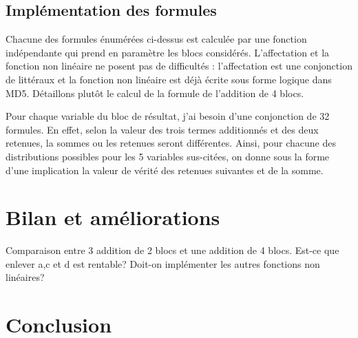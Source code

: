 \documentclass{article}
\begin{document}
\subsection{Implémentation des formules}
Chacune des formules énumérées ci-dessus est calculée par une fonction indépendante qui prend en paramètre les blocs considérés. L'affectation et la fonction non linéaire ne posent pas de difficultés : l'affectation est une conjonction de littéraux et la fonction non linéaire est déjà écrite sous forme logique dans MD5. Détaillons plutôt le calcul de la formule de l'addition de 4 blocs. 
\par
Pour chaque variable du bloc de résultat, j'ai besoin d'une conjonction de 32 formules. En effet, selon la valeur des trois termes additionnés et des deux retenues, la sommes ou les retenues seront différentes. Ainsi, pour chacune des distributions possibles pour les 5 variables sus-citées, on donne sous la forme d'une implication la valeur de vérité des retenues suivantes et de la somme.
\section{Bilan et améliorations}
Comparaison entre 3 addition de 2 blocs et une addition de 4 blocs. Est-ce que enlever a,c et d est rentable? Doit-on implémenter les autres fonctions non linéaires?

\section{Conclusion}
\end{document}
